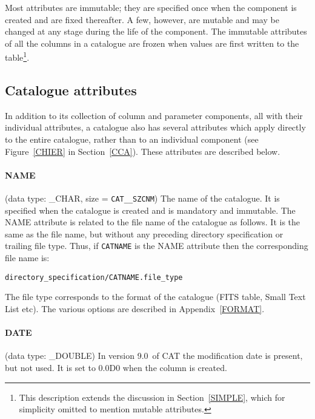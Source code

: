 \documentclass[11pt,twoside]{starlink}
\providecommand{\CATversion}{9.0~}
\begin{document}
Most attributes are immutable; they are specified once when the
component is created and are fixed thereafter. A few, however, are
mutable and may be changed at any stage during the life of the
component. The immutable attributes of all the columns in a catalogue
are frozen when values are first written to the table\footnote{This
description extends the discussion in Section~\ref{SIMPLE}, which for
simplicity omitted to mention mutable attributes.}.

\subsection{Catalogue attributes}

In addition to its collection of column and parameter
components,
all with their individual attributes, a catalogue also has several
attributes which apply directly to the entire catalogue, rather than to
an individual component (see Figure~\ref{CHIER} in Section~\ref{CCA}).
These attributes are described below.

\paragraph{NAME}
(data type: \_CHAR, size = \texttt{CAT\_\_SZCNM}) The name of the
catalogue. It is specified when the catalogue is created and is
mandatory and immutable. The NAME attribute is related to the file name
of the catalogue as follows. It is the same as the file name, but
without any preceding directory specification or trailing file type.
Thus, if \texttt{CATNAME} is the NAME attribute then the corresponding
file name is:

\begin{center}
\texttt{directory\_specification/CATNAME.file\_type}
\end{center}

The file type corresponds to the format of the catalogue (FITS table,
Small Text List etc). The various options are described in
Appendix~\ref{FORMAT}.

\paragraph{DATE}
(data type: \_DOUBLE)
In version \CATversion of CAT the modification date is present, but
not used. It is set to 0.0D0 when the column is created.
\end{document}
